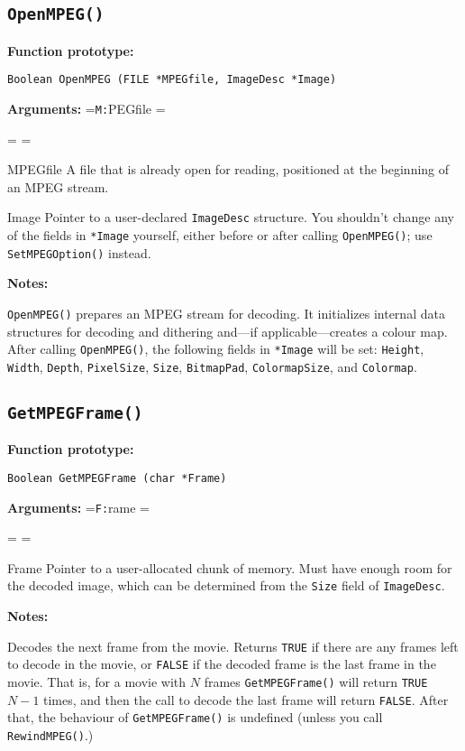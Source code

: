 \documentclass[11pt]{article}
\newcommand{\code}[1]{\texttt{#1}}
\newcommand{\ttlabel}[1]{\texttt{#1:}\quad\hfil}
\newenvironment{ttdescription}[1] {\newbox\holder
  \setbox\holder=\hbox{\ttlabel#1} \dimen0=\wd\holder
 \begin{list}{}
   {\labelsep=-0.25in \rightmargin=0.25in \leftmargin=\dimen0
     \addtolength{\leftmargin}{0.25in}
  \labelwidth=\leftmargin
  \let\makelabel\ttlabel}}%
{\end{list}}
\newcommand{\prototype}[1]{%
  \textbf{Function prototype:}\par \smallskip \code{#1}\par\medskip }
\newenvironment{Arguments}[1]{%
\noindent\textbf{Arguments:}%
\begin{ttdescription}{#1}}
{\end{ttdescription}\medskip}
\newenvironment{Notes}{%
\noindent\textbf{Notes:}\par\smallskip}
{\medskip}
\begin{document}
\subsection{\code{OpenMPEG()}}
\prototype{Boolean OpenMPEG (FILE *MPEGfile, ImageDesc *Image)}
\begin{Arguments}{MPEGfile}
\item[MPEGfile] A file that is already open for reading, positioned at
  the beginning of an MPEG stream.
\item[Image] Pointer to a user-declared \code{ImageDesc} structure.
  You shouldn't change any of the fields in \code{*Image} yourself,
  either before or after calling \code{OpenMPEG()}; use
  \code{SetMPEGOption()} instead.
\end{Arguments}
\begin{Notes}
  \code{OpenMPEG()} prepares an MPEG stream for decoding.  It
  initializes internal data structures for decoding and dithering
  and---if applicable---creates a colour map.  After calling
  \code{OpenMPEG()}, the following fields in \code{*Image} will be
  set: \code{Height}, \code{Width}, \code{Depth}, \code{PixelSize},
  \code{Size}, \code{BitmapPad}, \code{ColormapSize}, and
  \code{Colormap}.
\end{Notes}


\subsection{\code{GetMPEGFrame()}}
\prototype{Boolean GetMPEGFrame (char *Frame)}
\begin{Arguments}{Frame}
\item[Frame] Pointer to a user-allocated chunk of memory.  Must have
  enough room for the decoded image, which can be determined from the
  \code{Size} field of \code{ImageDesc}.
\end{Arguments}
\begin{Notes}
  Decodes the next frame from the movie.  Returns \code{TRUE} if there
  are any frames left to decode in the movie, or \code{FALSE} if the
  decoded frame is the last frame in the movie.  That is, for a movie
  with $N$ frames \code{GetMPEGFrame()} will return \code{TRUE} $N-1$
  times, and then the call to decode the last frame will return
  \code{FALSE}.  After that, the behaviour of \code{GetMPEGFrame()} is
  undefined (unless you call \code{RewindMPEG()}.)
\end{Notes}
\end{document}
